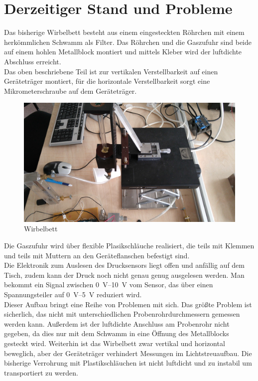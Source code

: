 \section{Derzeitiger Stand und Probleme}


Das bisherige Wirbelbett besteht aus einem eingesteckten Röhrchen mit einem herkömmlichen Schwamm als Filter. Das Röhrchen und die Gaszufuhr sind beide auf einem hohlen Metallblock montiert und mittels Kleber wird der luftdichte Abschluss erreicht. \\
Das oben beschriebene Teil ist zur vertikalen Verstellbarkeit auf einen Geräteträger montiert, für die horizontale Verstellbarkeit sorgt eine Mikrometerschraube auf dem Geräteträger. 

\begin{figure}[h]
	\begin{center}
		\includegraphics[scale=0.055]{Altes_Wirbelbett_oben.jpg}
		\caption{Wirbelbett}
	\end{center}
\end{figure}	


Die Gaszufuhr wird über flexible Plasikschläuche realisiert, die teils mit Klemmen und teils mit Muttern an den Geräteflanschen befestigt sind. \\
Die Elektronik zum Auslesen des Drucksensors liegt offen und anfällig auf dem Tisch, zudem kann der Druck noch nicht genau genug ausgelesen werden. Man bekommt ein Signal zwischen \SIrange{0}{10}{\volt} vom Sensor, das über einen Spannungsteiler auf \SIrange{0}{5}{\volt} reduziert wird. \\
Dieser Aufbau bringt eine Reihe von Problemen mit sich. Das größte Problem ist sicherlich, das nicht mit unterschiedlichen Probenrohrdurchmessern gemessen werden kann. Außerdem ist der luftdichte Anschluss am Probenrohr nicht gegeben, da dies nur mit dem Schwamm in eine Öffnung des Metallblocks gesteckt wird.
Weiterhin ist das Wirbelbett zwar vertikal und horizontal beweglich, aber der Geräteträger verhindert Messungen im Lichtstreuaufbau.
Die bisherige Verrohrung mit Plastikschläuchen ist nicht luftdicht und zu instabil um transportiert zu werden. \\


